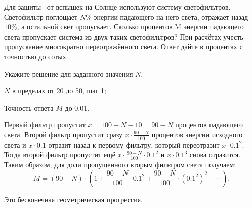 
Для защиты  от
вспышек на Солнце используют систему светофильтров. Светофильтр поглощает $N \%$ энергии падающего на 
него света, отражает назад $10 \%$, а остальной
свет пропускает. Сколько процентов M энергии
падающего света пропускает система из двух таких светофильтров? При расчётах
учесть пропускание многократно переотражённого света. Ответ дайте в процентах с точностью до сотых.

Укажите решение для заданного значения $N$.

\paramSection

$N$ в пределах от 20 до 50, шаг 1;         

Точность ответа $M$ до  0.01.

\solutionSection

Первый фильтр пропустит $x = 100 - N - 10 = 90 - N$ процентов падающего света. Второй фильтр пропустит сразу  
$x \cdot \frac{90-N}{100}$ процентов энергии исходного света и  $x \cdot 0.1$ отразит назад к первому фильтру, 
который переотразит  $x \cdot 0.1^2$. Тогда второй фильтр пропустит ещё $x \cdot \frac{90-N}{100} \cdot 0.1^2$ и 
$x \cdot 0.1^3$ снова отразится. Таким образом, для доли пропущенного вторым фильтром света получаем:
$$M=(90-N) \cdot (1+\frac{90-N}{100} \cdot 0.1^2+\frac{90-N}{100} \cdot (0.1^2 )^2+ \cdots) .$$

Это бесконечная геометрическая прогрессия.

